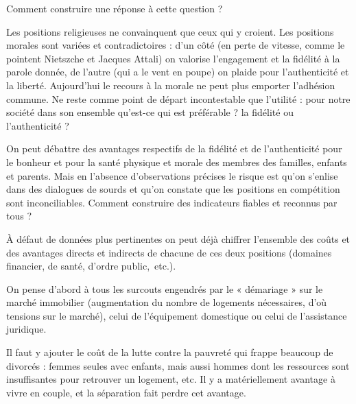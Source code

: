 Comment construire une réponse à cette question ?

Les positions religieuses ne convainquent que ceux qui y croient. Les positions morales sont variées et contradictoires : d'un côté (en perte de vitesse, comme le pointent Nietszche et Jacques Attali) on valorise l'engagement et la fidélité à la parole donnée, de l'autre (qui a le vent en poupe) on plaide pour l'authenticité et la liberté. Aujourd'hui le recours à la morale ne peut plus emporter l'adhésion commune. Ne reste comme point de départ incontestable que l'utilité : pour notre société dans son ensemble qu'est-ce qui est préférable ? la fidélité ou l'authenticité ?

On peut débattre des avantages respectifs de la fidélité et de l'authenticité pour le bonheur et pour la santé physique et morale des membres des familles, enfants et parents. Mais en l'absence d'observations précises le risque est qu'on s'enlise dans des dialogues de sourds et qu'on constate que les positions en compétition sont inconciliables. Comment construire des indicateurs fiables et reconnus par tous ? 

À défaut de données plus pertinentes on peut déjà chiffrer l'ensemble des coûts et des avantages directs et indirects de chacune de ces deux positions (domaines financier, de santé, d'ordre public,~etc.). 

On pense d'abord à tous les surcouts engendrés par le « démariage » sur le marché immobilier (augmentation du nombre de logements nécessaires, d'où tensions sur le marché), celui de l'équipement domestique ou celui de l'assistance juridique. 

Il faut y ajouter le coût de la lutte contre la pauvreté qui frappe beaucoup de divorcés : femmes seules avec enfants, mais aussi hommes dont les ressources sont insuffisantes pour retrouver un logement, etc. Il y a matériellement avantage à vivre en couple, et la séparation fait perdre cet avantage.

